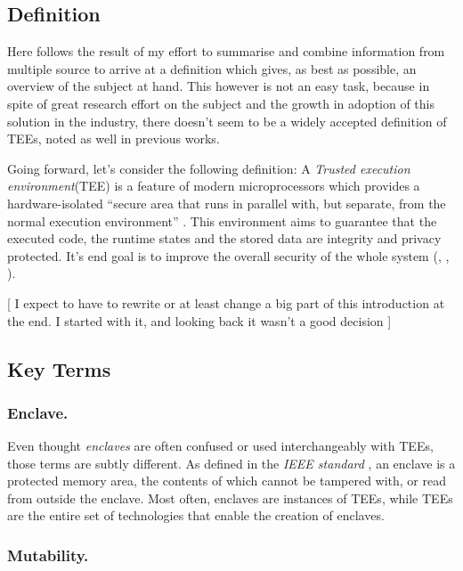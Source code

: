 \documentclass[runningheads,a4paper]{uwsese}
\begin{document}
\subsection{Definition}

Here follows the result of my effort to summarise and combine information from
multiple source to arrive at a definition which gives, as best as possible, an
overview of the subject at hand. This however is not an easy task, because in
spite of great research effort on the subject and the growth in adoption of
this solution in the industry, there doesn't seem to be a widely accepted
definition of TEEs, noted as well in previous works.

Going forward, let's consider the following definition: A \emph{Trusted
execution environment}(TEE) is a feature of modern microprocessors which
provides a hardware-isolated ``secure area that runs in parallel with, but
separate, from the normal execution environment'' \cite{tee_ieee_standard}.
This environment aims to guarantee that the executed code, the runtime states
and the stored data are integrity and privacy protected. It's end goal is to
improve the overall security of the whole system (\cite{tee_app_rev},
\cite{tee_in_securities}, \cite{tee_is_and_not}).

[ I expect to have to rewrite or at least change a big part of this introduction at the end. I started with it, and looking back it wasn't a good decision ]

\subsection{Key Terms}

\subsubsection{Enclave.}

Even thought \emph{enclaves} are often confused or used interchangeably with
TEEs, those terms are subtly different. As defined in the \emph{IEEE standard}
\cite{tee_ieee_standard}, an enclave is a protected memory area, the contents
of which cannot be tampered with, or read from outside the enclave. Most often,
enclaves are instances of TEEs, while TEEs are the entire set of technologies
that enable the creation of enclaves.

\subsubsection{Mutability.}
\end{document}
